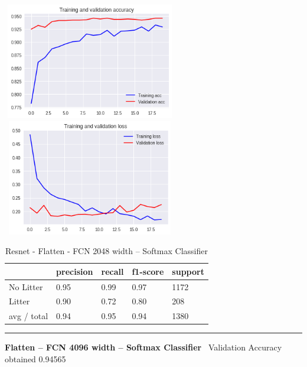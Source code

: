 \documentclass{IEEEtran}
\begin{document}
 \includegraphics[width=3in,height=2in]{resnet-img/resnet-img005.png} 
\includegraphics[width=3in,height=2in]{resnet-img/resnet-img006.png} 


\bigskip

\begin{table}[ht]
\centering
\caption{Resnet - Flatten - FCN 2048 width -- Softmax Classifier}
\begin{tabular}{|l|l|l|l|l|} 
\hline
 & precision & recall  & f1-score  & support \\\hline
No Litter  &
0.95  &
0.99  &
0.97  &
1172 \\\hline
Litter  &
0.90  &
0.72  &
0.80  &
208 \\\hline
avg / total  &
0.94  &
0.95  &
0.94  &
1380\\\hline
\end{tabular}
\end{table}


\begin{center}\noindent\rule{8cm}{0.4pt}\end{center}


\bigskip


\bigskip

\textbf{Flatten -- FCN 4096 width -- Softmax Classifier} \ 
Validation Accuracy obtained 0.94565
\end{document}

